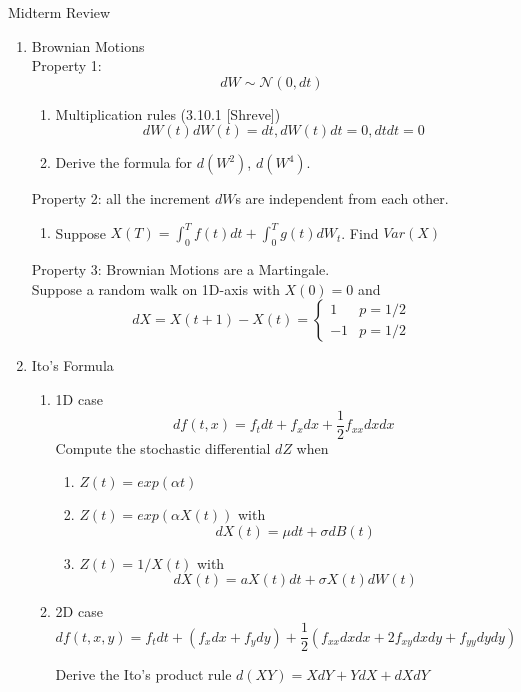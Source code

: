 \documentclass[12pt]{article}
\begin{document}
     
{\bf \centerline{\Large Midterm Review}}
\vskip0.5cm

\begin{enumerate}
\item Brownian Motions
\\
Property 1: 
\[
dW\sim\mathcal N(0,dt)
\]
\begin{enumerate}
\item Multiplication rules (3.10.1 [Shreve])
\[
dW(t)dW(t)=dt, dW(t)dt=0, dtdt=0
\]
\newpage
\item Derive the formula for $d(W^2)$, $d(W^4)$.
\end{enumerate}
Property 2: all the increment $dW$s are independent from each other.
\begin{enumerate}
\item Suppose $X(T)=\int_0^T f(t)dt + \int_0^T g(t)dW_t$. Find $Var(X)$
\end{enumerate}
\newpage
Property 3: Brownian Motions are a Martingale.
\\
Suppose a random walk on 1D-axis with $X(0)=0$ and 
\[
dX = X(t+1) -X(t) =
\begin{cases}
1 & p=1/2 \\
-1 & p=1/2
\end{cases}
\] 
\newpage
\item Ito's Formula
\\
\begin{enumerate}
\item 1D case
\[
df(t,x) = f_tdt+f_xdx + \frac12 f_{xx}dxdx
\]
 Compute the stochastic differential $dZ$ when 
\begin{enumerate}
\item $Z(t) = exp(\alpha t)$
\item $Z(t) = exp(\alpha X(t))$ with 
\[
dX(t) = \mu dt + \sigma dB(t)
\]
\item
$Z(t)=1/X(t)$ with 
\[
dX(t) = aX(t)dt + \sigma X(t) dW(t)
\]
\end{enumerate}
\item 2D case
\[
df(t,x,y) = f_tdt+(f_xdx+f_ydy) + \frac12( f_{xx}dxdx+2f_{xy}dxdy+f_{yy}dydy )
\]

Derive the Ito's product rule $d(XY)=XdY+YdX+dXdY$


\end{enumerate}
\end{enumerate}
\end{document}
